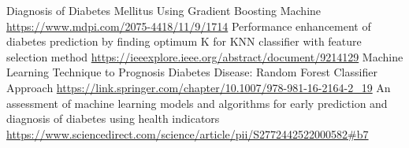 \documentclass[11pt]{article}
\begin{document}
\begin{thebibliography}{1}

   Diagnosis of Diabetes Mellitus Using Gradient Boosting Machine \url{https://www.mdpi.com/2075-4418/11/9/1714}
   Performance enhancement of diabetes prediction by finding optimum K for KNN classifier with feature selection method \url{https://ieeexplore.ieee.org/abstract/document/9214129}
   Machine Learning Technique to Prognosis Diabetes Disease: Random Forest Classifier Approach \url{https://link.springer.com/chapter/10.1007/978-981-16-2164-2_19}
   An assessment of machine learning models and algorithms for early prediction and diagnosis of diabetes using health indicators \url{https://www.sciencedirect.com/science/article/pii/S2772442522000582#b7}
  



  \end{thebibliography}
\end{document}
